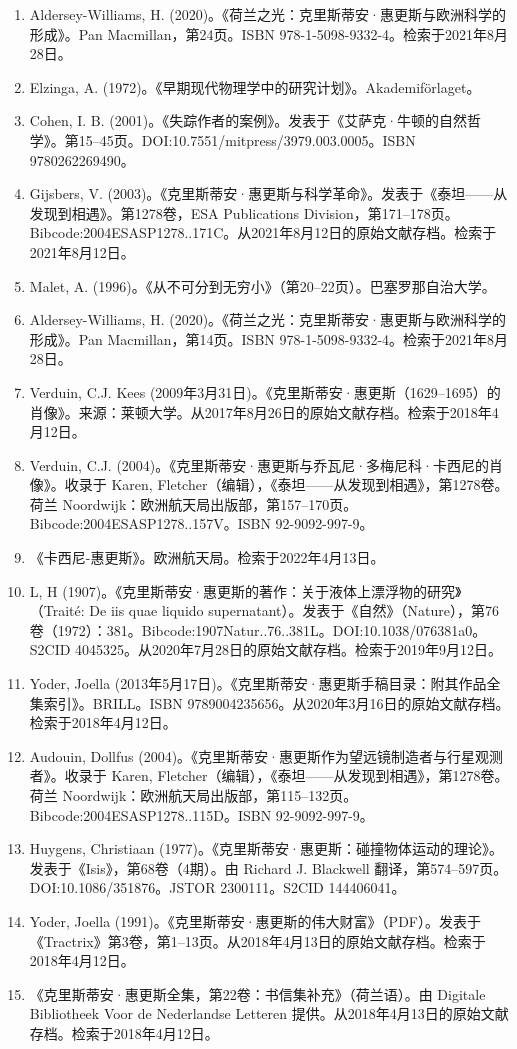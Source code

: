 \begin{enumerate}
\item Aldersey-Williams, H. (2020)。《荷兰之光：克里斯蒂安·惠更斯与欧洲科学的形成》。Pan Macmillan，第24页。ISBN 978-1-5098-9332-4。检索于2021年8月28日。
\item Elzinga, A. (1972)。《早期现代物理学中的研究计划》。Akademiförlaget。
\item Cohen, I. B. (2001)。《失踪作者的案例》。发表于《艾萨克·牛顿的自然哲学》。第15–45页。DOI:10.7551/mitpress/3979.003.0005。ISBN 9780262269490。
\item Gijsbers, V. (2003)。《克里斯蒂安·惠更斯与科学革命》。发表于《泰坦——从发现到相遇》。第1278卷，ESA Publications Division，第171–178页。Bibcode:2004ESASP1278..171C。从2021年8月12日的原始文献存档。检索于2021年8月12日。
\item Malet, A. (1996)。《从不可分到无穷小》（第20–22页）。巴塞罗那自治大学。
\item Aldersey-Williams, H. (2020)。《荷兰之光：克里斯蒂安·惠更斯与欧洲科学的形成》。Pan Macmillan，第14页。ISBN 978-1-5098-9332-4。检索于2021年8月28日。
\item Verduin, C.J. Kees (2009年3月31日)。《克里斯蒂安·惠更斯（1629–1695）的肖像》。来源：莱顿大学。从2017年8月26日的原始文献存档。检索于2018年4月12日。
\item Verduin, C.J. (2004)。《克里斯蒂安·惠更斯与乔瓦尼·多梅尼科·卡西尼的肖像》。收录于 Karen, Fletcher（编辑），《泰坦——从发现到相遇》，第1278卷。荷兰 Noordwijk：欧洲航天局出版部，第157–170页。Bibcode:2004ESASP1278..157V。ISBN 92-9092-997-9。
\item 《卡西尼-惠更斯》。欧洲航天局。检索于2022年4月13日。
\item L, H (1907)。《克里斯蒂安·惠更斯的著作：关于液体上漂浮物的研究》（Traité: De iis quae liquido supernatant）。发表于《自然》（Nature），第76卷（1972）：381。Bibcode:1907Natur..76..381L。DOI:10.1038/076381a0。S2CID 4045325。从2020年7月28日的原始文献存档。检索于2019年9月12日。
\item Yoder, Joella (2013年5月17日)。《克里斯蒂安·惠更斯手稿目录：附其作品全集索引》。BRILL。ISBN 9789004235656。从2020年3月16日的原始文献存档。检索于2018年4月12日。
\item Audouin, Dollfus (2004)。《克里斯蒂安·惠更斯作为望远镜制造者与行星观测者》。收录于 Karen, Fletcher（编辑），《泰坦——从发现到相遇》，第1278卷。荷兰 Noordwijk：欧洲航天局出版部，第115–132页。Bibcode:2004ESASP1278..115D。ISBN 92-9092-997-9。
\item Huygens, Christiaan (1977)。《克里斯蒂安·惠更斯：碰撞物体运动的理论》。发表于《Isis》，第68卷（4期）。由 Richard J. Blackwell 翻译，第574–597页。DOI:10.1086/351876。JSTOR 2300111。S2CID 144406041。
\item Yoder, Joella (1991)。《克里斯蒂安·惠更斯的伟大财富》（PDF）。发表于《Tractrix》第3卷，第1–13页。从2018年4月13日的原始文献存档。检索于2018年4月12日。
\item 《克里斯蒂安·惠更斯全集，第22卷：书信集补充》（荷兰语）。由 Digitale Bibliotheek Voor de Nederlandse Letteren 提供。从2018年4月13日的原始文献存档。检索于2018年4月12日。
\end{enumerate}
